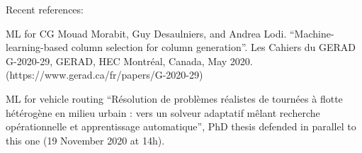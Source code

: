 \begin{frame}{}
  \centering
  Recent references:
  \begin{block}{ML for CG}
      Mouad Morabit, Guy Desaulniers, and Andrea Lodi. ``Machine-learning-based column selection for column generation''. Les Cahiers du GERAD G-2020-29, GERAD, HEC Montréal, Canada, May 2020. (https://www.gerad.ca/fr/papers/G-2020-29)
  \end{block}
  \begin{block}{ML for vehicle routing}
    ``Résolution de problèmes réalistes de tournées à flotte hétérogène en milieu urbain : vers un solveur adaptatif mêlant recherche opérationnelle et apprentissage automatique'', PhD thesis defended in parallel to this one (19 November 2020 at 14h).
  \end{block}

\end{frame}




